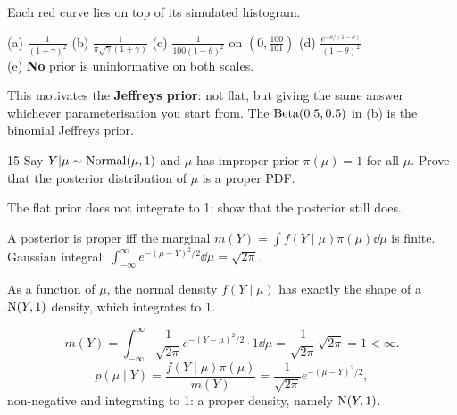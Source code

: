 \documentclass[11pt]{article}
\begin{document}
\begin{sanity}
Each red curve lies on top of its simulated histogram. \checkmark
\end{sanity}

\begin{answer}
(a) $\frac1{(1+\gamma)^2}$ \quad (b) $\frac1{\pi\sqrt\gamma(1+\gamma)}$ \quad (c) $\frac{1}{100(1-\theta)^2}$ on $(0,\frac{100}{101})$ \quad (d) $\frac{e^{-\theta/(1-\theta)}}{(1-\theta)^2}$\\
(e) \textbf{No} prior is uninformative on both scales.
\end{answer}

\begin{takeaway}
This motivates the \textbf{Jeffreys prior}: not flat, but giving the same answer whichever parameterisation you start from. The $\mathrm{Beta}(0.5,0.5)$ in (b) is the binomial Jeffreys prior.
\end{takeaway}


\begin{problem}{15}
Say $Y|\mu\sim\mathrm{Normal}(\mu,1)$ and $\mu$ has improper prior $\pi(\mu)=1$ for all $\mu$. Prove that the posterior distribution of $\mu$ is a proper PDF.
\end{problem}

\begin{restate}
The flat prior does not integrate to 1; show that the posterior still does.
\end{restate}

\begin{recall}
A posterior is proper iff the marginal $m(Y)=\int f(Y\mid\mu)\pi(\mu)\dd\mu$ is finite. Gaussian integral: $\int_{-\infty}^\infty e^{-(\mu-Y)^2/2}\dd\mu=\sqrt{2\pi}$.
\end{recall}

\begin{keyidea}
As a function of $\mu$, the normal density $f(Y\mid\mu)$ has exactly the shape of a $\mathrm{N}(Y,1)$ density, which integrates to 1.
\end{keyidea}

\solution
{}
\[
m(Y)=\int_{-\infty}^{\infty}\frac{1}{\sqrt{2\pi}}e^{-(Y-\mu)^2/2}\cdot1\dd\mu=\frac{1}{\sqrt{2\pi}}\sqrt{2\pi}=1<\infty.
\]
\[
p(\mu\mid Y)=\frac{f(Y\mid\mu)\pi(\mu)}{m(Y)}=\frac{1}{\sqrt{2\pi}}e^{-(\mu-Y)^2/2},
\]
non-negative and integrating to 1: a proper density, namely $\mathrm{N}(Y,1)$.
\end{document}
